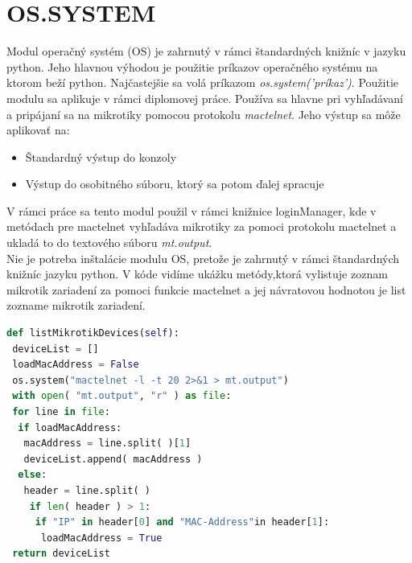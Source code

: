 \section{OS.SYSTEM}
Modul operačný systém (OS) \cite{OS} je zahrnutý v rámci štandardných knižníc v jazyku python. Jeho hlavnou výhodou je použitie príkazov operačného systému na ktorom beží python. Najčastejšie sa volá príkazom \textit{os.system('príkaz')}.
Použitie modulu sa aplikuje v rámci diplomovej práce. Používa sa hlavne pri vyhľadávaní a pripájaní sa na mikrotiky pomocou protokolu \textit{mactelnet}. Jeho výstup sa môže aplikovať na:\begin{itemize}
\item Štandardný výstup do konzoly
\item Výstup do osobitného súboru, ktorý sa potom ďalej spracuje
\end{itemize}
V rámci práce sa tento modul použil v rámci knižnice loginManager, kde v metódach pre mactelnet vyhľadáva mikrotiky za pomoci protokolu mactelnet a ukladá to do textového súboru \textit{mt.output}. \\
Nie je potreba inštalácie modulu  OS, pretože je zahrnutý v rámci štandardných knižníc jazyku python. V kóde vidíme ukážku metódy,ktorá vylistuje zoznam mikrotik zariadení za pomoci funkcie mactelnet a jej návratovou hodnotou je list zozname mikrotik zariadení.
\begin{lstlisting}[language=python, frame=single, caption=Metóda na vyhľadanie MAC adries mikrotikov, captionpos=b, basicstyle=\footnotesize, showstringspaces=false]
def listMikrotikDevices(self):
 deviceList = []
 loadMacAddress = False
 os.system("mactelnet -l -t 20 2>&1 > mt.output")
 with open( "mt.output", "r" ) as file:
 for line in file:
  if loadMacAddress:
   macAddress = line.split( )[1]
   deviceList.append( macAddress )
  else:
   header = line.split( )
    if len( header ) > 1:
     if "IP" in header[0] and "MAC-Address"in header[1]:
      loadMacAddress = True
 return deviceList
\end{lstlisting}
